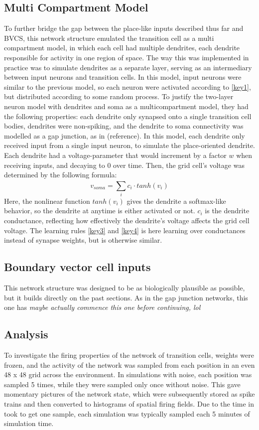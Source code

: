 \documentclass{article}
\begin{document}
    \subsection{Multi Compartment Model}
    To further bridge the gap between the place-like inputs described thus far and BVCS, this network structure emulated the transition cell as a multi compartment model, in which each cell had multiple dendrites, each dendrite responsible for activity in one region of space. The way this was implemented in practice was to simulate dendrites as a separate layer, serving as an intermediary between input neurons and transition cells. In this model, input neurons were similar to the previous model, so each neuron were activated according to \ref*{key1}, but distributed according to some random process. To justify the two-layer neuron model with dendrites and soma as a multicompartment model, they had the following properties: each dendrite only synapsed onto a single transition cell bodies, dendrites were non-spiking, and the dendrite to soma connectivity was modelled as a gap junction, as in (reference). In this model, each dendrite only received input from a single input neuron, to simulate the place-oriented dendrite. Each dendrite had a voltage-parameter that would increment by a factor \(w\) when receiving inputs, and decaying to 0 over time. Then, the grid cell's voltage was determined by the following formula: \[ v_{soma} = \sum_{i}^{} c_i \cdot tanh(v_i)\] Here, the nonlinear function \(tanh(v_i)\) gives the dendrite a softmax-like behavior, so the dendrite at anytime is either activated or not. \(c_i\) is the dendrite conductance, reflecting how effectively the dendrite's voltage affects the grid cell voltage. The learning rules \ref*{key3} and \ref*{key4} is here learning over conductances instead of synapse weights, but is otherwise similar.

    \subsection{Boundary vector cell inputs}
    This network structure was designed to be as biologically plausible as possible, but it builds directly on the past sections. As in the gap junction networks, this one has \textit{maybe actually commence this one before continuing, lol}


    \subsection{Analysis}
    To investigate the firing properties of the network of transition cells, weights were frozen, and the activity of the network was sampled from each position in an even 48 x 48 grid across the environment. In simulations with noise, each position was sampled 5 times, while they were sampled only once without noise. This gave momentary pictures of the network state, which were subsequently stored as spike trains and then converted to histograms of spatial firing fields. Due to the time in took to get one sample, each simulation was typically sampled each 5 minutes of simulation time.
\end{document}

